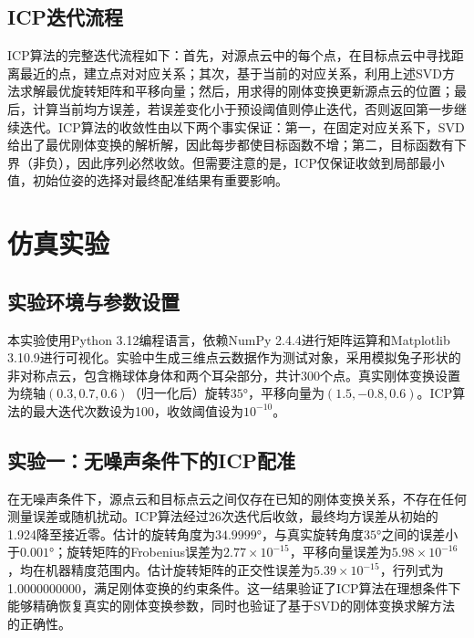 \documentclass[a4paper,12pt]{ctexrep}
\begin{document}
\section{ICP迭代流程}

ICP算法的完整迭代流程如下：首先，对源点云中的每个点，在目标点云中寻找距离最近的点，建立点对对应关系；其次，基于当前的对应关系，利用上述SVD方法求解最优旋转矩阵和平移向量；然后，用求得的刚体变换更新源点云的位置；最后，计算当前均方误差，若误差变化小于预设阈值则停止迭代，否则返回第一步继续迭代。ICP算法的收敛性由以下两个事实保证：第一，在固定对应关系下，SVD给出了最优刚体变换的解析解，因此每步都使目标函数不增；第二，目标函数有下界（非负），因此序列必然收敛。但需要注意的是，ICP仅保证收敛到局部最小值，初始位姿的选择对最终配准结果有重要影响。

\chapter{仿真实验}

\section{实验环境与参数设置}

本实验使用Python 3.12编程语言，依赖NumPy 2.4.4进行矩阵运算和Matplotlib 3.10.9进行可视化。实验中生成三维点云数据作为测试对象，采用模拟兔子形状的非对称点云，包含椭球体身体和两个耳朵部分，共计300个点。真实刚体变换设置为绕轴$(0.3, 0.7, 0.6)$（归一化后）旋转$35°$，平移向量为$(1.5, -0.8, 0.6)$。ICP算法的最大迭代次数设为100，收敛阈值设为$10^{-10}$。

\section{实验一：无噪声条件下的ICP配准}

在无噪声条件下，源点云和目标点云之间仅存在已知的刚体变换关系，不存在任何测量误差或随机扰动。ICP算法经过26次迭代后收敛，最终均方误差从初始的1.924降至接近零。估计的旋转角度为$34.9999°$，与真实旋转角度$35°$之间的误差小于$0.001°$；旋转矩阵的Frobenius误差为$2.77\times 10^{-15}$，平移向量误差为$5.98\times 10^{-16}$，均在机器精度范围内。估计旋转矩阵的正交性误差为$5.39\times 10^{-15}$，行列式为1.0000000000，满足刚体变换的约束条件。这一结果验证了ICP算法在理想条件下能够精确恢复真实的刚体变换参数，同时也验证了基于SVD的刚体变换求解方法的正确性。
\end{document}
